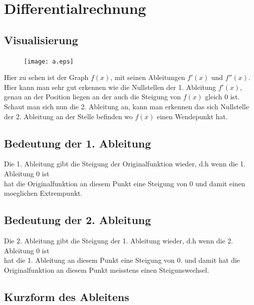\documentclass[a4paper]{article} %
\begin{document}
	\section{Differentialrechnung}
	\subsection{Visualisierung}


	\begin{minipage}{0.3\textwidth}
	\begin{figure}[H]
	\texttt{[image: a.eps]}
	\caption{}
	\end{figure}
	\end{minipage} \hfill
	\begin{minipage}{0.5\textwidth}

	Hier zu sehen ist der Graph $f(x)$, mit seinen Ableitungen $f'(x)$ und $f''(x)$.
	Hier kann man sehr gut erkennen wie die Nullstellen der 1. Ableitung $f'(x)$, genau an
	der Position liegen an der auch die Steigung von $f(x)$ gleich 0 ist.\\
	Schaut man sich nun die 2. Ableitung an, kann man erkennen das sich Nullstelle der 2. Ableitung an der Stelle befinden wo $f(x)$ einen Wendepunkt hat.

	\end{minipage}




	\subsection{Bedeutung der 1. Ableitung}

	Die 1. Ableitung gibt die Steigung der Originalfunktion wieder, d.h wenn die 1. Ableitung 0 ist \\hat die Originalfunktion an diesem Punkt eine
	Steigung von 0 und damit einen moeglichen Extrempunkt.

	\subsection{Bedeutung der 2. Ableitung}
	Die 2. Ableitung gibt die Steigung der 1. Ableitung wieder, d.h wenn die 2. Ableitung 0 ist \\hat die 1. Ableitung an diesem Punkt eine
	Steigung von 0. und damit hat die Originalfunktion an diesem Punkt meisstens einen Steigunswechsel.
	\subsection{Kurzform des Ableitens}
\end{document}
